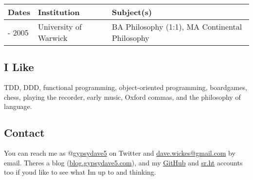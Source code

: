 \begin{longtable}[]{@{}lll@{}}
\toprule\noalign{}
Dates & Institution & Subject(s) \\
\midrule\noalign{}
\endhead
\bottomrule\noalign{}
\endlastfoot
2000 - 2005 & University of Warwick & BA Philosophy (1:1), MA
Continental Philosophy \\
\end{longtable}

\hypertarget{i-like}{%
\subsection{I Like}\label{i-like}}

TDD, DDD, functional programming, object-oriented programming,
boardgames, chess, playing the recorder, early music, Oxford commas, and
the philosophy of language.

\hypertarget{contact}{%
\subsection{Contact}\label{contact}}

You can reach me as @\href{https://twitter.com/gypsydave5}{gypsydave5}
on Twitter and \href{mailto:dave@gypsydave5.com}{dave.wickes@gmail.com}
by email. There\textquotesingle s a blog
(\href{http://blog.gypsydave5.com/}{blog.gypsydave5.com}), and my
\href{https://github.com/gypsydave5}{GitHub} and
\href{https://git.sr.ht/~dew/}{sr.ht} accounts too if
you\textquotesingle d like to see what I\textquotesingle m up to and
thinking.
